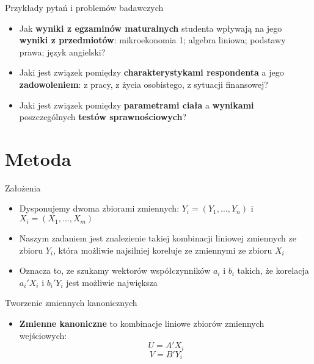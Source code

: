 \documentclass{beamer}
\begin{document}
\begin{frame}{Przykłady pytań i problemów badawczych}
  \begin{itemize}
  \item Jak \textbf{wyniki z egzaminów maturalnych} studenta wpływają na jego \textbf{wyniki z przedmiotów}: mikroekonomia 1; algebra liniowa; podstawy prawa; język angielski?
 \item Jaki jest związek pomiędzy \textbf{charakterystykami respondenta} a jego \textbf{zadowoleniem}: z pracy, z życia osobistego, z sytuacji finansowej?
 \item Jaki jest związek pomiędzy \textbf{parametrami ciała} a \textbf{wynikami} poszczególnych \textbf{testów sprawnościowych}?
  \end{itemize}
\end{frame}

\section{Metoda}

\begin{frame}{Założenia}
  \begin{itemize}
  \item Dysponujemy dwoma zbiorami zmiennych: $Y_i= (Y_1, \dots, Y_n)$ i~$X_i= (X_1, \dots, X_m)$
  \item Naszym zadaniem jest znalezienie takiej kombinacji liniowej
zmiennych ze zbioru $Y_i$, która możliwie najsilniej koreluje ze zmiennymi ze zbioru $X_i$
  \item Oznacza to, ze szukamy wektorów współczynników $a_i$ i $b_i$ takich, że korelacja $a_i'X_i$ i $b_i'Y_i$ jest możliwie największa
\end{itemize}
\end{frame}

\begin{frame}{Tworzenie zmiennych kanonicznych}
  \begin{itemize}
  \item \textbf{Zmienne kanoniczne} to kombinacje liniowe zbiorów zmiennych wejściowych:
  $$ U = A'X_i $$
  $$ V = B'Y_i $$
  \end{itemize}
\end{frame}
\end{document}
